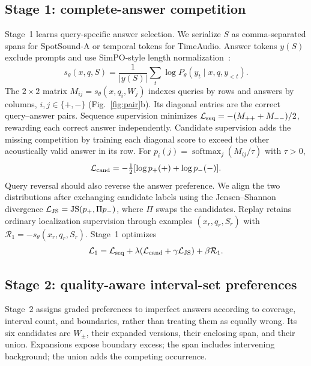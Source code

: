 \subsection{Stage 1: complete-answer competition}
Stage~1 learns query-specific answer selection. We serialize $S$ as comma-separated spans for SpotSound-A or temporal tokens for TimeAudio. Answer tokens $y(S)$ exclude prompts and use SimPO-style length normalization~\cite{meng2024simpo}:
\begin{equation}
s_\theta(x,q,S)=\frac{1}{|y(S)|}\sum_t\log P_\theta(y_t\mid x,q,y_{<t}).
\label{eq:score}
\end{equation}
The $2\times2$ matrix $M_{ij}=s_\theta(x,q_i,W_j)$ indexes queries by rows and answers by columns, $i,j\in\{+,-\}$ (Fig.~\ref{fig:pair}b). Its diagonal entries are the correct query--answer pairs. Sequence supervision minimizes $\mathcal L_{\rm seq}=-(M_{++}+M_{--})/2$, rewarding each correct answer independently. Candidate supervision adds the missing competition by training each diagonal score to exceed the other acoustically valid answer in its row. For $p_i(j)=\operatorname{softmax}_j(M_{ij}/\tau)$ with $\tau>0$,
\begin{equation}
\mathcal L_{\rm cand}=-\tfrac12[\log p_+(+)+\log p_-(-)].
\label{eq:candidate}
\end{equation}
Query reversal should also reverse the answer preference. We align the two distributions after exchanging candidate labels using the Jensen--Shannon divergence $\mathcal L_{\rm JS}=\operatorname{JS}(p_+,\Pi p_-)$, where $\Pi$ swaps the candidates. Replay retains ordinary localization supervision through examples $(x_r,q_r,S_r)$ with $\mathcal R_1=-s_\theta(x_r,q_r,S_r)$. Stage~1 optimizes
\begin{equation}
\mathcal L_1=\mathcal L_{\rm seq}+\lambda(\mathcal L_{\rm cand}
+\gamma\mathcal L_{\rm JS})+\beta\mathcal R_1.
\label{eq:loss}
\end{equation}


\subsection{Stage 2: quality-aware interval-set preferences}
Stage~2 assigns graded preferences to imperfect answers according to coverage, interval count, and boundaries, rather than treating them as equally wrong. Its six candidates are $W_\pm$, their expanded versions, their enclosing span, and their union. Expansions expose boundary excess; the span includes intervening background; the union adds the competing occurrence.

